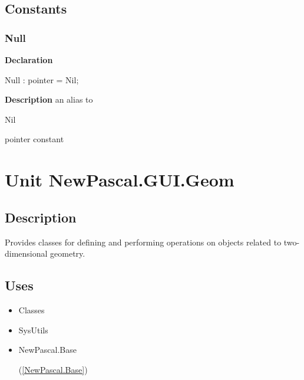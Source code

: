 \documentclass{report}
\newif\ifpdf
\begin{document}
\section{Constants}
\ifpdf
\subsection*{\large{\textbf{Null}}\normalsize\hspace{1ex}\hrulefill}
\else
\subsection*{Null}
\fi
\label{NewPascal.Base-Null}
\begin{list}{}{
\setlength{\itemindent}{0cm}
\setlength{\listparindent}{0cm}
\setlength{\leftmargin}{\evensidemargin}
\addtolength{\leftmargin}{\tmplength}
\settowidth{\labelsep}{X}
\addtolength{\leftmargin}{\labelsep}
\setlength{\labelwidth}{\tmplength}
}
\item[\textbf{Declaration}\hfill]
\ifpdf
\begin{flushleft}
\fi
\begin{ttfamily}
Null : pointer = Nil;\end{ttfamily}

\ifpdf
\end{flushleft}
\fi

\par
\item[\textbf{Description}]
an alias to \begin{ttfamily}Nil\end{ttfamily} pointer constant

\end{list}
\chapter{Unit NewPascal.GUI.Geom}
\label{NewPascal.GUI.Geom}
\section{Description}
Provides classes for defining and performing operations on objects related to two{-}dimensional geometry.
\section{Uses}
\begin{itemize}
\item \begin{ttfamily}Classes\end{ttfamily}\item \begin{ttfamily}SysUtils\end{ttfamily}\item \begin{ttfamily}NewPascal.Base\end{ttfamily}(\ref{NewPascal.Base})\end{itemize}
\end{document}
